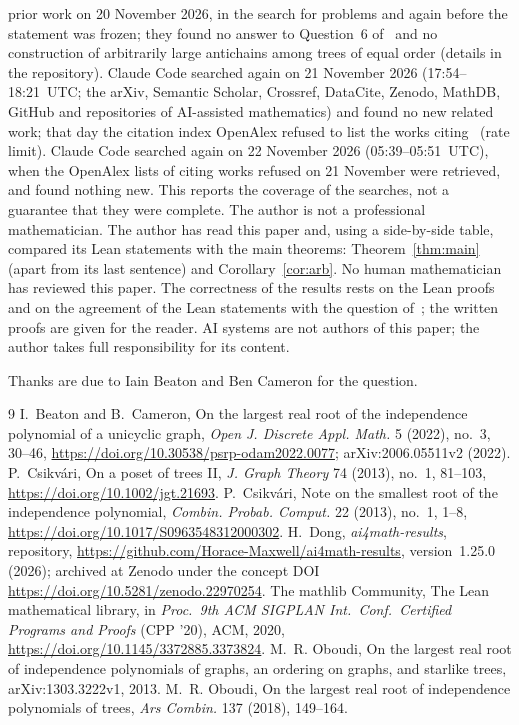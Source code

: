 \documentclass[11pt]{article}
\theoremstyle{definition}
\theoremstyle{remark}
\newcommand{\repoversion}{1.25.0}
\begin{document}
prior work on 20 November 2026, in the search for problems and again before
the statement was frozen; they found no answer to Question~6 of~\cite{bc} and
no construction of arbitrarily large antichains among trees of equal order
(details in the repository). Claude Code searched again on 21 November 2026 (17:54--18:21~UTC; the arXiv, Semantic Scholar, Crossref, DataCite, Zenodo, MathDB, GitHub and repositories of AI-assisted mathematics) and found no new related work; that day the citation index OpenAlex refused to list the works citing~\cite{bc} (rate limit). Claude Code searched again on 22 November 2026 (05:39--05:51~UTC), when the OpenAlex lists of citing works refused on 21 November were retrieved, and found nothing new. This reports the coverage of
the searches, not a guarantee that they were complete. The author is not a
professional mathematician. The author has read this paper and, using a side-by-side table, compared its Lean statements with the main theorems: Theorem~\ref{thm:main} (apart from its last sentence) and Corollary~\ref{cor:arb}. No human mathematician has reviewed
this paper. The correctness of the results rests on the Lean proofs and on the
agreement of the Lean statements with the question of~\cite{bc}; the written
proofs are given for the reader. AI systems are not authors of this paper; the
author takes full responsibility for its content.

\medskip
\noindent Thanks are due to Iain Beaton and Ben Cameron for the question.

{\small
\begin{thebibliography}{9}
\setlength{\itemsep}{1pt}
 I.~Beaton and B.~Cameron, On the largest real root of the
independence polynomial of a unicyclic graph, \emph{Open J. Discrete Appl.
Math.} 5 (2022), no.~3, 30--46,
\url{https://doi.org/10.30538/psrp-odam2022.0077}; arXiv:2006.05511v2 (2022).
 P.~Csikvári, On a poset of trees II, \emph{J. Graph Theory} 74
(2013), no.~1, 81--103, \url{https://doi.org/10.1002/jgt.21693}.
 P.~Csikvári, Note on the smallest root of the independence
polynomial, \emph{Combin. Probab. Comput.} 22 (2013), no.~1, 1--8,
\url{https://doi.org/10.1017/S0963548312000302}.
 H.~Dong, \emph{ai4math-results}, repository,
\url{https://github.com/Horace-Maxwell/ai4math-results}, version~\repoversion{}
(2026); archived at Zenodo under the concept DOI
\url{https://doi.org/10.5281/zenodo.22970254}.
The mathlib Community, The Lean mathematical library, in \emph{Proc.\ 9th ACM
SIGPLAN Int.\ Conf.\ Certified Programs and Proofs} (CPP '20), ACM, 2020,
\url{https://doi.org/10.1145/3372885.3373824}.
 M.~R. Oboudi, On the largest real root of independence
polynomials of graphs, an ordering on graphs, and starlike trees,
arXiv:1303.3222v1, 2013.
 M.~R. Oboudi, On the largest real root of independence
polynomials of trees, \emph{Ars Combin.} 137 (2018), 149--164.
\end{thebibliography}}
\end{document}
